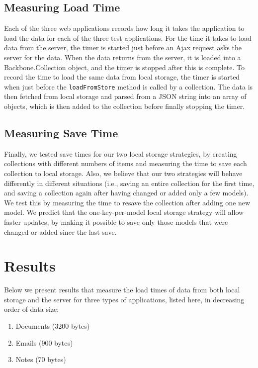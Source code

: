 \documentclass[12pt]{article}
\begin{document}
\subsection{Measuring Load Time}

Each of the three web applications records how long it takes the application to
load the data for each of the three test applications. For the time it takes to
load data from the server, the timer is started just before an Ajax request
asks the server for the data. When the data returns from the server, it is
loaded into a Backbone.Collection object, and the timer is stopped after this
is complete. To record the time to load the same data from local storage, the
timer is started when just before the \verb=loadFromStore= method is called by
a collection. The data is then fetched from local storage and parsed from a JSON
string into an array of objects, which is then added to the collection before
finally stopping the timer.

\subsection{Measuring Save Time}

Finally, we tested save times for our two local storage strategies, by
creating collections with different numbers of items and measuring the time to
save each collection to local storage. Also, we believe that our two strategies
will behave differently in different situations (i.e., saving an entire
collection for the first time, and saving a collection again after having
changed or added only a few models). We test this by measuring the time to
resave the collection after adding one new model. We predict that the
one-key-per-model local storage strategy will allow faster updates, by making
it possible to save only those models that were changed or added since the last
save.

\section{Results}

Below we present results that measure the load times of data from both local
storage and the server for three types of applications, listed here, in
decreasing order of data size:

\begin{enumerate}
\item Documents (3200 bytes)
\item Emails (900 bytes)
\item Notes (70 bytes)
\end{enumerate}
\end{document}
